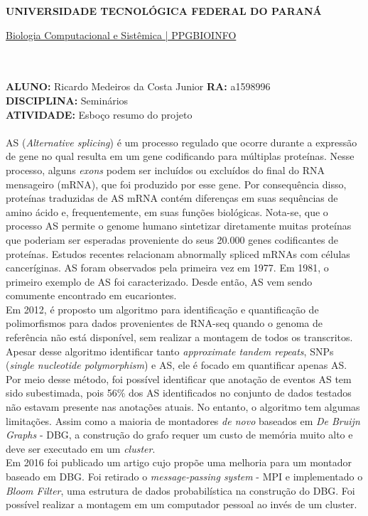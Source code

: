 \documentclass[a4paper, 12pt]{article}
\begin{document}
\textbf{UNIVERSIDADE TECNOLÓGICA FEDERAL DO PARANÁ}\\
\centerline{\underline{Biologia Computacional e Sistêmica | PPGBIOINFO}}\\\\
\textbf{ALUNO:} Ricardo Medeiros da Costa Junior   \textbf{RA:} a1598996 \\
\textbf{DISCIPLINA:} Seminários \\
\textbf{ATIVIDADE:} Esboço resumo do projeto \\
\\
\indent AS (\emph{Alternative splicing}) é um processo regulado que ocorre durante a expressão de gene no qual resulta em um gene codificando para múltiplas proteínas. Nesse processo, alguns \emph{exons} podem ser incluídos ou excluídos do final do RNA mensageiro (mRNA), que foi produzido por esse gene. Por consequência disso, proteínas traduzidas de AS mRNA contém diferenças em suas sequências de amino ácido e, frequentemente, em suas funções biológicas. Nota-se, que o processo AS permite o genome humano sintetizar diretamente muitas proteínas que poderiam ser esperadas proveniente do seus 20.000 genes codificantes de proteínas. Estudos recentes relacionam abnormally spliced mRNAs com células canceríginas. AS foram observados pela primeira vez em 1977. Em 1981, o primeiro exemplo de AS foi caracterizado. Desde então, AS vem sendo comumente encontrado em eucariontes. \\
\indent Em 2012, é proposto um algoritmo para identificação e quantificação de polimorfismos para dados provenientes de RNA-seq quando o genoma de referência não está disponível, sem realizar a montagem de todos os transcritos. Apesar desse algoritmo identificar tanto \emph{approximate tandem repeats}, SNPs (\emph{single nucleotide polymorphism}) e AS, ele é focado em quantificar apenas AS. Por meio desse método, foi possível identificar que anotação de eventos AS tem sido subestimada, pois 56\% dos AS identificados no conjunto de dados testados não estavam presente nas anotações atuais. No entanto, o algoritmo tem algumas limitações. Assim como a maioria de montadores \emph{de novo} baseados em \emph{De Bruijn Graphs} - DBG, a construção do grafo requer um custo de memória muito alto e deve ser executado em um \emph{cluster}. \\
\indent Em 2016 foi publicado um artigo cujo propõe uma melhoria para um montador baseado em DBG. Foi retirado o \emph{message-passing system} - MPI e implementado o \emph{Bloom Filter}, uma estrutura de dados probabilística na construção do DBG. Foi possível realizar a montagem em um computador pessoal ao invés de um cluster. \\
\end{document}
